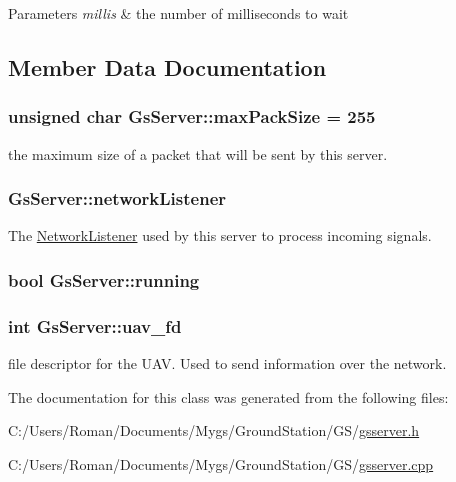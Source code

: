 \begin{DoxyParams}{Parameters}
{\em millis} & the number of milliseconds to wait \\
\hline
\end{DoxyParams}


\subsection{Member Data Documentation}
\hypertarget{class_gs_server_a5db50514e830e5d9aeeed83e23472501}{}
\subsubsection[{max\+Pack\+Size}]{\setlength{\rightskip}{0pt plus 5cm}unsigned char Gs\+Server\+::max\+Pack\+Size = 255}\label{class_gs_server_a5db50514e830e5d9aeeed83e23472501}
the maximum size of a packet that will be sent by this server. \hypertarget{class_gs_server_aa115a3c8f593c29bc6d68f102dbf1941}{}
\subsubsection[{network\+Listener}]{ Gs\+Server\+::network\+Listener}\label{class_gs_server_aa115a3c8f593c29bc6d68f102dbf1941}
The \hyperlink{class_network_listener}{Network\+Listener} used by this server to process incoming signals. \hypertarget{class_gs_server_a720185d9a2050ae2d5ebda4e7262ba6e}{}
\subsubsection[{running}]{\setlength{\rightskip}{0pt plus 5cm}bool Gs\+Server\+::running}\label{class_gs_server_a720185d9a2050ae2d5ebda4e7262ba6e}
\hypertarget{class_gs_server_aee6ff9911df099594d4483cb116ed808}{}
\subsubsection[{uav\+\_\+fd}]{\setlength{\rightskip}{0pt plus 5cm}int Gs\+Server\+::uav\+\_\+fd}\label{class_gs_server_aee6ff9911df099594d4483cb116ed808}
file descriptor for the U\+A\+V. Used to send information over the network. 

The documentation for this class was generated from the following files\+:\begin{DoxyCompactItemize}
\item 
C\+:/\+Users/\+Roman/\+Documents/\+Mygs/\+Ground\+Station/\+G\+S/\hyperlink{gsserver_8h}{gsserver.\+h}\item 
C\+:/\+Users/\+Roman/\+Documents/\+Mygs/\+Ground\+Station/\+G\+S/\hyperlink{gsserver_8cpp}{gsserver.\+cpp}\end{DoxyCompactItemize}

